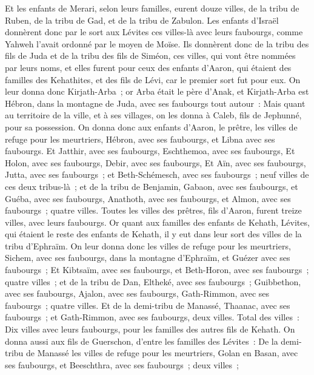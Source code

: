 \begin{multicols}{2}
Et les enfants de Merari, selon leurs familles, eurent douze villes, de la tribu de Ruben, de la tribu de Gad, et de la tribu de Zabulon.
Les enfants d'Israël donnèrent donc par le sort aux Lévites ces villes-là avec leurs faubourgs, comme Yahweh l'avait ordonné par le moyen de Moïse.
Ils donnèrent donc de la tribu des fils de Juda et de la tribu des fils de Siméon, ces villes, qui vont être nommées par leurs noms,
et elles furent pour ceux des enfants d'Aaron, qui étaient des familles des Kehathites, et des fils de Lévi, car le premier sort fut pour eux. 
On leur donna donc Kirjath-Arba~; or Arba était le père d'Anak, et Kirjath-Arba est Hébron, dans la montagne de Juda, avec ses faubourgs tout autour~: 
Mais quant au territoire de la ville, et à ses villages, on les donna à Caleb, fils de Jephunné, pour sa possession.
On donna donc aux enfants d'Aaron, le prêtre, les villes de refuge pour les meurtriers, Hébron, avec ses faubourgs, et Libna avec ses faubourgs.
Et Jatthir, avec ses faubourgs, Eschthemoa, avec ses faubourgs,
Et Holon, avec ses faubourgs, Debir, avec ses faubourgs,
Et Aïn, avec ses faubourgs, Jutta, avec ses faubourgs~; et Beth-Schémesch, avec ses faubourgs~; neuf villes de ces deux tribus-là~;
et de la tribu de Benjamin, Gabaon, avec ses faubourgs, et Guéba, avec ses faubourgs,
Anathoth, avec ses faubourgs, et Almon, avec ses faubourgs~; quatre villes.
Toutes les villes des prêtres, fils d'Aaron, furent treize villes, avec leurs faubourgs.
Or quant aux familles des enfants de Kehath, Lévites, qui étaient le reste des enfants de Kehath, il y eut dans leur sort des villes de la tribu d'Ephraïm.
On leur donna donc les villes de refuge pour les meurtriers, Sichem, avec ses faubourgs, dans la montagne d'Ephraïm, et Guézer avec ses faubourgs~;
Et Kibtsaïm, avec ses faubourgs, et Beth-Horon, avec ses faubourgs~; quatre villes~;
et de la tribu de Dan, Eltheké, avec ses faubourgs~; Guibbethon, avec ses faubourgs,
Ajalon, avec ses faubourgs, Gath-Rimmon, avec ses faubourgs~; quatre villes.
Et de la demi-tribu de Manassé, Thaanac, avec ses faubourgs~; et Gath-Rimmon, avec ses faubourgs, deux villes.
Total des villes~: Dix villes avec leurs faubourgs, pour les familles des autres fils de Kehath.
On donna aussi aux fils de Guerschon, d'entre les familles des Lévites~: De la demi-tribu de Manassé les villes de refuge pour les meurtriers, Golan en Basan, avec ses faubourgs, et Beeschthra, avec ses faubourgs~; deux villes~;

\end{multicols}

